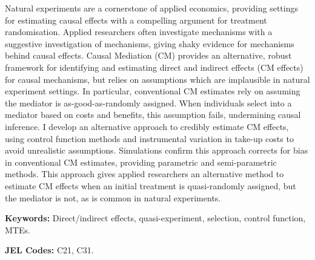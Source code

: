 \noindent
Natural experiments are a cornerstone of applied economics, providing settings for estimating causal effects with a compelling argument for treatment randomisation.
Applied researchers often investigate mechanisms with a suggestive investigation of mechanisms, giving shaky evidence for mechanisms behind causal effects.
Causal Mediation (CM) provides an alternative, robust framework for identifying and estimating direct and indirect effects (CM effects) for causal mechanisms, but relies on assumptions which are implausible in natural experiment settings.
In particular, conventional CM estimates rely on assuming the mediator is as-good-as-randomly assigned.
When individuals select into a mediator based on costs and benefits, this assumption fails, undermining causal inference.
I develop an alternative approach to credibly estimate CM effects, using control function methods and instrumental variation in take-up costs to avoid unrealistic assumptions.
Simulations confirm this approach corrects for bias in conventional CM estimates, providing parametric and semi-parametric methods.
This approach gives applied researchers an alternative method to estimate CM effects when an initial treatment is quasi-randomly assigned, but the mediator is not, as is common in natural experiments.

\vspace{0.5cm}
\noindent
\textbf{Keywords:}
Direct/indirect effects, quasi-experiment, selection, control function, MTEs.

\vspace{0.1cm}
\noindent
\textbf{JEL Codes:}
C21, C31.
